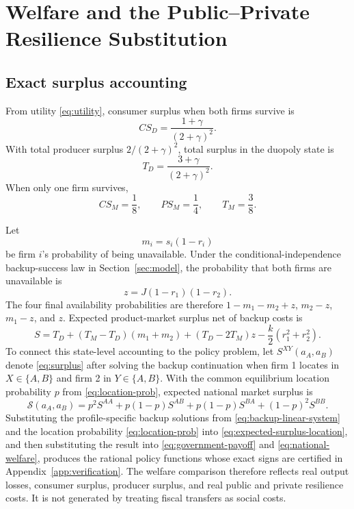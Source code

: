 \section{Welfare and the Public--Private Resilience Substitution}\label{sec:welfare}

\subsection{Exact surplus accounting}

From utility \eqref{eq:utility}, consumer surplus when both firms survive is
\begin{equation}
CS_D=\frac{1+\gamma}{(2+\gamma)^2}.
\end{equation}
With total producer surplus $2/(2+\gamma)^2$, total surplus in the duopoly state is
\begin{equation}
T_D=\frac{3+\gamma}{(2+\gamma)^2}.
\label{eq:TD}
\end{equation}
When only one firm survives,
\begin{equation}
CS_M=\frac18,\qquad PS_M=\frac14,\qquad T_M=\frac38.
\label{eq:TM}
\end{equation}

Let
\begin{equation}
m_i=s_i(1-r_i)
\end{equation}
be firm $i$'s probability of being unavailable. Under the conditional-independence backup-success law in Section~\ref{sec:model}, the probability that both firms are unavailable is
\begin{equation}
z=J(1-r_1)(1-r_2).
\end{equation}
The four final availability probabilities are therefore $1-m_1-m_2+z$, $m_2-z$, $m_1-z$, and $z$. Expected product-market surplus net of backup costs is
\begin{equation}
S
=T_D+(T_M-T_D)(m_1+m_2)+(T_D-2T_M)z
-\frac{k}{2}(r_1^2+r_2^2).
\label{eq:surplus}
\end{equation}
To connect this state-level accounting to the policy problem, let $S^{XY}(a_A,a_B)$ denote \eqref{eq:surplus} after solving the backup continuation when firm 1 locates in $X\in\{A,B\}$ and firm 2 in $Y\in\{A,B\}$. With the common equilibrium location probability $p$ from \eqref{eq:location-prob}, expected national market surplus is
\begin{equation}
\mathcal S(a_A,a_B)
=
p^2 S^{AA}
+p(1-p)S^{AB}
+p(1-p)S^{BA}
+(1-p)^2S^{BB}.
\label{eq:expected-surplus-location}
\end{equation}
Substituting the profile-specific backup solutions from \eqref{eq:backup-linear-system} and the location probability \eqref{eq:location-prob} into \eqref{eq:expected-surplus-location}, and then substituting the result into \eqref{eq:government-payoff} and \eqref{eq:national-welfare}, produces the rational policy functions whose exact signs are certified in Appendix~\ref{app:verification}. The welfare comparison therefore reflects real output losses, consumer surplus, producer surplus, and real public and private resilience costs. It is not generated by treating fiscal transfers as social costs.

